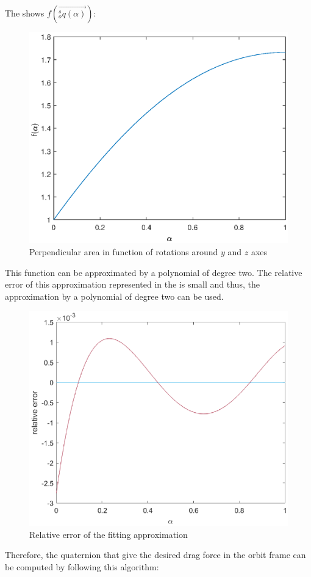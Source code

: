 The  shows $f(\vec{ ^s_o q(\alpha)})$:
\begin{figure}[H]
	\centering
	\includegraphics[width=0.8\linewidth]{figures/path_f.eps}
	\caption{Perpendicular area in function of rotations around $y$ and $z$ axes}
	\label{fig:path_alpha}
\end{figure} 
This function can be approximated by a polynomial of degree two. The relative error of this approximation represented in the  is small and thus, the approximation by a polynomial of degree two can be used. 
\begin{figure}[H]
	\centering
	\includegraphics[width=0.8\linewidth]{figures/rel_err.eps}
	\caption{Relative error of the fitting approximation }
	\label{fig:rel_err}
\end{figure}
Therefore, the quaternion that give the desired drag force in the orbit frame can be computed by following this algorithm:
